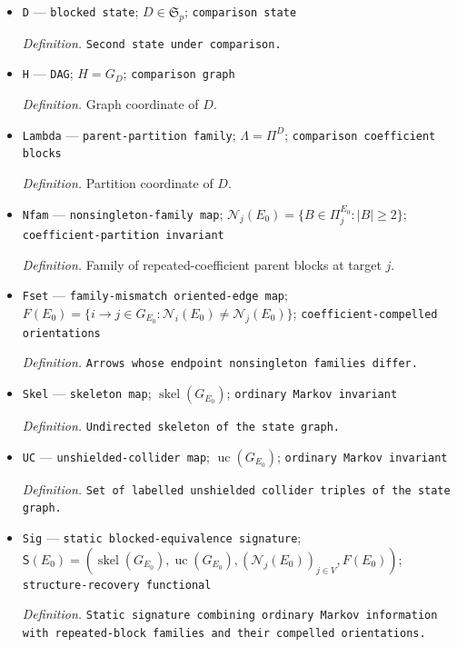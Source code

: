 \documentclass{article}
\begin{document}
\begin{itemize}
  \par\smallskip\noindent\emph{Definition.} Partition coordinate of \(C\).
  \item \texttt{D} --- \texttt{blocked state}; \(D\in\mathfrak S_p\); \texttt{comparison state}
  \par\smallskip\noindent\emph{Definition.} \texttt{Second state under comparison.}
  \item \texttt{H} --- \texttt{DAG}; \(H=G_D\); \texttt{comparison graph}
  \par\smallskip\noindent\emph{Definition.} Graph coordinate of \(D\).
  \item \texttt{Lambda} --- \texttt{parent-\allowbreak{}partition family}; \(\Lambda=\Pi^D\); \texttt{comparison coefficient blocks}
  \par\smallskip\noindent\emph{Definition.} Partition coordinate of \(D\).
  \item \texttt{Nfam} --- \texttt{nonsingleton-\allowbreak{}family map}; \(\mathcal N_j(E_0)=\{B\in\Pi^{E_0}_j:|B|\geq2\}\); \texttt{coefficient-\allowbreak{}partition invariant}
  \par\smallskip\noindent\emph{Definition.} Family of repeated-coefficient parent blocks at target \(j\).
  \item \texttt{Fset} --- \texttt{family-\allowbreak{}mismatch oriented-\allowbreak{}edge map}; \(F(E_0)=\{i\to j\in G_{E_0}:\mathcal N_i(E_0)\neq\mathcal N_j(E_0)\}\); \texttt{coefficient-\allowbreak{}compelled orientations}
  \par\smallskip\noindent\emph{Definition.} \texttt{Arrows whose endpoint nonsingleton families differ.}
  \item \texttt{Skel} --- \texttt{skeleton map}; \(\operatorname{skel}(G_{E_0})\); \texttt{ordinary Markov invariant}
  \par\smallskip\noindent\emph{Definition.} \texttt{Undirected skeleton of the state graph.}
  \item \texttt{UC} --- \texttt{unshielded-\allowbreak{}collider map}; \(\operatorname{uc}(G_{E_0})\); \texttt{ordinary Markov invariant}
  \par\smallskip\noindent\emph{Definition.} \texttt{Set of labelled unshielded collider triples of the state graph.}
  \item \texttt{Sig} --- \texttt{static blocked-\allowbreak{}equivalence signature}; \(\mathsf S(E_0)=(\operatorname{skel}(G_{E_0}),\operatorname{uc}(G_{E_0}),(\mathcal N_j(E_0))_{j\in V},F(E_0))\); \texttt{structure-\allowbreak{}recovery functional}
  \par\smallskip\noindent\emph{Definition.} \texttt{Static signature combining ordinary Markov information with repeated-\allowbreak{}block families and their compelled orientations.}

\end{itemize}
\end{document}
